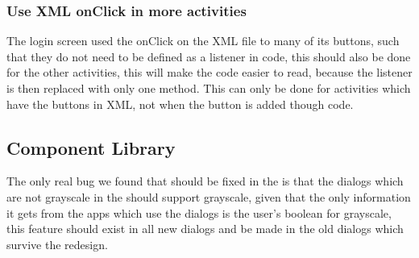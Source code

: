 \subsubsection{Use XML onClick in more activities}
The login screen used the onClick on the XML file to many of its buttons, such
that they do not need to be defined as a listener in code, this should also be
done for the other activities, this will make the code easier to read, because
the listener is then replaced with only one method. This can only be done for
activities which have the buttons in XML, not when the button is added though
code.

\subsection{Component Library}
The only real bug we found that should be fixed in the  is
that the dialogs which are not grayscale in the  should support
grayscale, given that the only information it gets from the apps which use the
dialogs is the user's boolean for grayscale, this feature should exist in all
new dialogs and be made in the old dialogs which survive the redesign.


